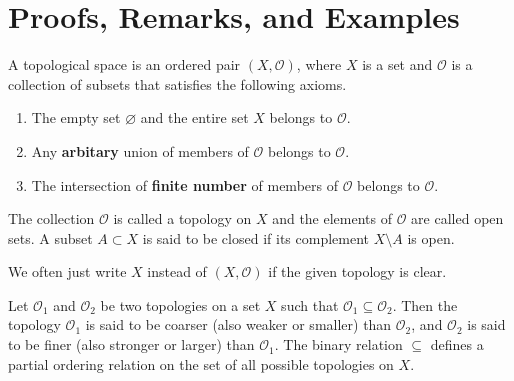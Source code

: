 \section{Proofs, Remarks, and Examples}
%
\begin{defbox}
    \begin{definition}
        A {\color{maththen}topological space} is an {\color{mathobj}ordered pair} \((X, \mathcal{O})\), where \(X\) is a {\color{mathif}set} and \(\mathcal{O}\) is a {\color{mathif}collection of subsets} that satisfies the following {\color{mathrem}axioms}.
        \begin{enumerate}
            \item The {\color{mathif}empty set} \(\varnothing\) and the {\color{mathif}entire set} \(X\) belongs to \(\mathcal{O}\).
            \item Any \textbf{arbitary} {\color{mathif}union} of members of \(\mathcal{O}\) belongs to \(\mathcal{O}\).
            \item The {\color{mathif}intersection} of \textbf{finite number} of members of \(\mathcal{O}\) belongs to \(\mathcal{O}\).
        \end{enumerate}
        
        The {\color{mathobj}collection} \(\mathcal{O}\) is called a {\color{maththen}topology} on \(X\) and the {\color{mathobj}elements} of \(\mathcal{O}\) are called {\color{maththen}open sets}. A {\color{mathobj}subset} \(A \subset X\) is said to be {\color{maththen}closed} if its {\color{mathif}complement} \(X \setminus A\) is {\color{mathif}open}.
        
        We often just write \(X\) instead of \((X, \mathcal{O})\) if the given topology is clear.
    \end{definition}
\end{defbox}
%
\begin{defbox}
    \begin{definition}
        Let \(\mathcal{O}_1\) and \(\mathcal{O}_2\) be two topologies on a set \(X\) such that \(\mathcal{O}_1 \subseteq \mathcal{O}_2\). Then the topology \(\mathcal{O}_1\) is said to be coarser (also weaker or smaller) than \(\mathcal{O}_2\), and \(\mathcal{O}_2\) is said to be finer (also stronger or larger) than \(\mathcal{O}_1\). The binary relation \(\subseteq\) defines a partial ordering relation on the set of all possible topologies on \(X\).
    \end{definition}
\end{defbox}
